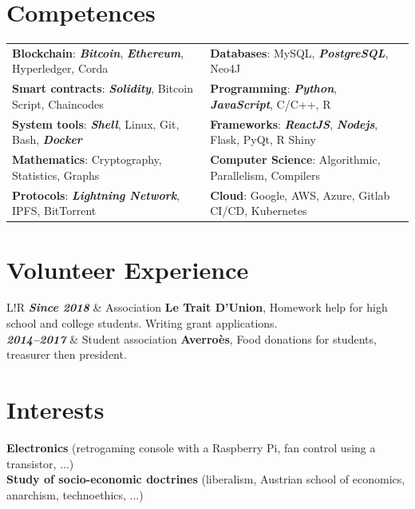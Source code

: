 \documentclass[10pt]{article}
\newcommand\VRule{\color{lightgray}\vrule width 2pt}
\begin{document}
\section*{Competences}
\begin{tabular}{ l l }
\textbf{Blockchain}: \textbf{\textit{Bitcoin}}, \textbf{\textit{Ethereum}}, Hyperledger, Corda & \textbf{Databases}: MySQL, \textbf{\textit{PostgreSQL}}, Neo4J \\[0.1cm]
\textbf{Smart contracts}: \textbf{\textit{Solidity}}, Bitcoin Script, Chaincodes & \textbf{Programming}: \textbf{\textit{Python}}, \textbf{\textit{JavaScript}}, C/C++, R  \\[0.1cm]
\textbf{System tools}: \textbf{\textit{Shell}}, Linux, Git, Bash, \textbf{\textit{Docker}} & \textbf{Frameworks}: \textbf{\textit{ReactJS}}, \textbf{\textit{Nodejs}}, Flask, PyQt, R Shiny \\[0.1cm]
\textbf{Mathematics}: Cryptography, Statistics, Graphs & \textbf{Computer Science}: Algorithmic, Parallelism, Compilers \\[0.1cm]
\textbf{Protocols}: \textbf{\textit{Lightning Network}}, IPFS, BitTorrent & \textbf{Cloud}: Google, AWS, Azure, Gitlab CI/CD, Kubernetes
\end{tabular}

\section*{Volunteer Experience}
\begin{tabular}{L!{\VRule}R}
\textbf{\textit{Since 2018}} & Association \textbf{Le Trait D’Union}, Homework help for high school and college students. Writing grant applications. \\[0.75cm]

\textbf{\textit{2014--2017}} & Student association \textbf{Averroès}, Food donations for students, treasurer then president. \\
\end{tabular}
\section*{Interests}
\hspace*{1ex} \textbf{Electronics} (retrogaming console with a Raspberry Pi, fan control using a transistor, ...) \\
\hspace*{1ex} \textbf{Study of socio-economic doctrines} (liberalism, Austrian school of economics, anarchism, technoethics, ...) \\
\end{document}
